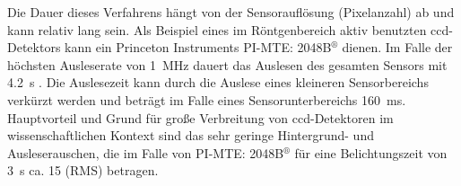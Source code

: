 \noindent
Die Dauer dieses Verfahrens hängt von der Sensorauflösung (Pixelanzahl) ab und kann relativ lang sein. Als Beispiel eines im Röntgenbereich aktiv benutzten \gls{ccd}-Detektors kann ein Princeton Instruments PI-MTE: 2048B$^{\text{®}}$ dienen. Im Falle der höchsten Ausleserate von \SI{1}{\mega\hertz} dauert das Auslesen des gesamten Sensors mit   \SI{4,2}{\second} \cite[s. 81, Readout-Charakterstik]{mte-manual}. Die Auslesezeit kann  durch die Auslese eines kleineren Sensorbereichs verkürzt werden und beträgt im Falle eines  Sensorunterbereichs \SI{160}{\milli\second}. Hauptvorteil und Grund für große Verbreitung von \gls{ccd}-Detektoren im wissenschaftlichen Kontext sind das sehr geringe Hintergrund- und Ausleserauschen, die im Falle von PI-MTE: 2048B$^{\text{®}}$ für eine Belichtungszeit von \SI{3}{\second} ca. \SI{15}{\electron} (RMS) betragen.

